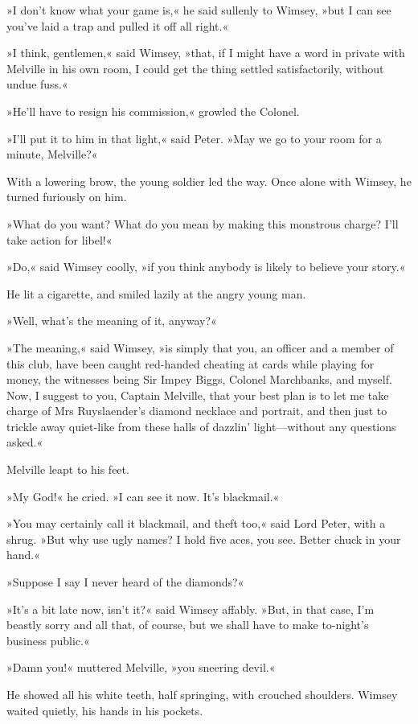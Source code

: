»I don't know what your game is,« he said sullenly to Wimsey, »but I can see you've laid a trap and pulled it off all right.«

»I think, gentlemen,« said Wimsey, »that, if I might have a word in private with Melville in his own room, I could get the thing settled satisfactorily, without undue fuss.«

»He'll have to resign his commission,« growled the Colonel.

»I'll put it to him in that light,« said Peter. »May we go to your room for a minute, Melville?«

With a lowering brow, the young soldier led the way. Once alone with Wimsey, he turned furiously on him.

»What do you want? What do you mean by making this monstrous charge? I'll take action for libel!«

»Do,« said Wimsey coolly, »if you think anybody is likely to believe your story.«

He lit a cigarette, and smiled lazily at the angry young man.

»Well, what's the meaning of it, anyway?«

»The meaning,« said Wimsey, »is simply that you, an officer and a member of this club, have been caught red-handed cheating at cards while playing for money, the witnesses being Sir Impey Biggs, Colonel Marchbanks, and myself. Now, I suggest to you, Captain Melville, that your best plan is to let me take charge of Mrs Ruyslaender's diamond necklace and portrait, and then just to trickle away quiet-like from these halls of dazzlin' light—without any questions asked.«

Melville leapt to his feet.

»My God!« he cried. »I can see it now. It's blackmail.«

»You may certainly call it blackmail, and theft too,« said Lord Peter, with a shrug. »But why use ugly names? I hold five aces, you see. Better chuck in your hand.«

»Suppose I say I never heard of the diamonds?«

»It's a bit late now, isn't it?« said Wimsey affably. »But, in that case, I'm beastly sorry and all that, of course, but we shall have to make to-night's business public.«

»Damn you!« muttered Melville, »you sneering devil.«

He showed all his white teeth, half springing, with crouched shoulders. Wimsey waited quietly, his hands in his pockets.

